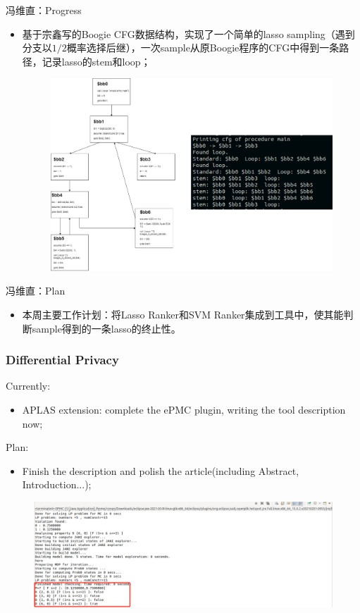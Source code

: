 \documentclass[aspectratio=1610, 13pt]{beamer}
\begin{document}
\begin{frame}{冯维直：Progress}
    \begin{itemize}
        \item 基于宗鑫写的Boogie CFG数据结构，实现了一个简单的lasso sampling（遇到分支以$1/2$概率选择后继），一次sample从原Boogie程序的CFG中得到一条路径，记录lasso的stem和loop；
            \begin{figure}[htbp]
    \includegraphics[width=0.7\linewidth]{lasso.jpg}
\end{figure}
\end{itemize}    
\end{frame}

\begin{frame}{冯维直：Plan}
    
    \begin{itemize}
        \item 本周主要工作计划：将Lasso Ranker和SVM Ranker集成到工具中，使其能判断sample得到的一条lasso的终止性。
\end{itemize}    
\end{frame}

\begin{frame}\frametitle{Differential Privacy}
Currently:
\begin{itemize}
  \item APLAS extension: complete the ePMC plugin, writing the tool description now;
\end{itemize}

Plan:
\begin{itemize}
  \item Finish the description and polish the article(including Abstract, Introduction...);
\end{itemize}

\begin{figure}[htbp]
    \includegraphics[width=1\linewidth]{epmc.jpeg}
\end{figure}
\end{frame}
\end{document}
